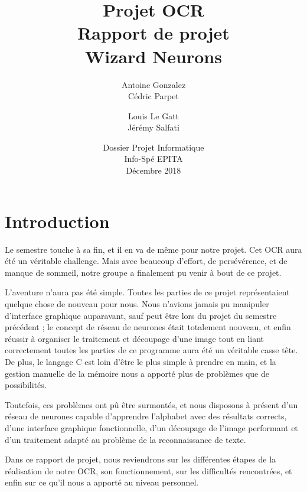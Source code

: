\documentclass[12pt]{report}
\begin{document}
\title{
	{\Huge Projet OCR}\\
	\vspace{2em}
	{\Huge Rapport de projet}\\
	{\large Wizard Neurons}
}
\author{
	Antoine Gonzalez\\
	Cédric Parpet
	\and
	Louis Le Gatt\\
	Jérémy Salfati}
\date{
	\vspace{15em}
	{Dossier Projet Informatique\\
	Info-Spé EPITA\\
	Décembre 2018}
}

\maketitle
\newpage
\newpage
\tableofcontents

\chapter{Introduction}

Le semestre touche à sa fin, et il en va de même pour notre projet. Cet OCR aura été un véritable challenge. Mais avec beaucoup d'effort, de persévérence, et de manque de sommeil, notre groupe a finalement pu venir à bout de ce projet.

L'aventure n'aura pas été simple. Toutes les parties de ce projet représentaient quelque chose de nouveau pour nous. Nous n'avions jamais pu manipuler d'interface graphique auparavant, sauf peut être lors du projet du semestre précédent ; le concept de réseau de neurones était totalement nouveau, et enfin réussir à organiser le traitement et découpage d'une image tout en liant correctement toutes les parties de ce programme aura été un véritable casse tête. De plus, le langage C est loin d'être le plus simple à prendre en main, et la gestion manuelle de la mémoire nous a apporté plus de problèmes que de possibilités.

\newpage

Toutefois, ces problèmes ont pû être surmontés, et nous disposons à présent d'un réseau de neurones capable d'apprendre l'alphabet avec des résultats corrects, d'une interface graphique fonctionnelle, d'un découpage de l'image performant et d'un traitement adapté au problème de la reconnaissance de texte.

Dans ce rapport de projet, nous reviendrons sur les différentes étapes de la réalisation de notre OCR, son fonctionnement, sur les difficultés rencontrées, et enfin sur ce qu'il nous a apporté au niveau personnel.
\end{document}
